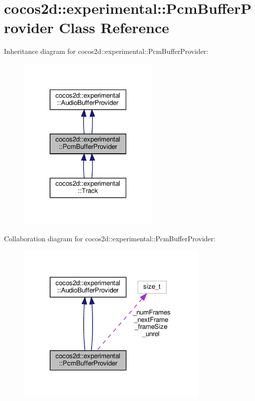 \hypertarget{classcocos2d_1_1experimental_1_1PcmBufferProvider}{}\section{cocos2d\+:\+:experimental\+:\+:Pcm\+Buffer\+Provider Class Reference}
\label{classcocos2d_1_1experimental_1_1PcmBufferProvider}


Inheritance diagram for cocos2d\+:\+:experimental\+:\+:Pcm\+Buffer\+Provider\+:
\nopagebreak
\begin{figure}[H]
\begin{center}
\leavevmode
\includegraphics[width=195pt]{classcocos2d_1_1experimental_1_1PcmBufferProvider__inherit__graph}
\end{center}
\end{figure}


Collaboration diagram for cocos2d\+:\+:experimental\+:\+:Pcm\+Buffer\+Provider\+:
\nopagebreak
\begin{figure}[H]
\begin{center}
\leavevmode
\includegraphics[width=264pt]{classcocos2d_1_1experimental_1_1PcmBufferProvider__coll__graph}
\end{center}
\end{figure}
